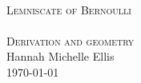 \begin{titlepage}
\begin{center}
\HRule \\[0.5cm]
\textsc{\huge Lemniscate of Bernoulli}\\[0.5cm]
\HRule \\[0.5cm]
\textsc{\Large Derivation and geometry}\\[0.5cm]
\vfill
Hannah Michelle Ellis\\[1.0cm]
\today
\end{center}
\end{titlepage}
